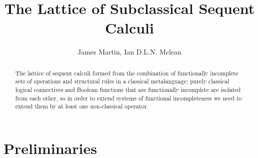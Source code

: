 \documentclass{article}
\author{James Martin, Ian D.L.N. Mclean}
\title{The Lattice of Subclassical Sequent Calculi}
\begin{document}
\maketitle

\begin{abstract}
The lattice of sequent calculi formed from the combination of functionally incomplete sets of operations and structural rules in a classical metalanguage; purely classical logical connectives and Boolean functions that are functionally incomplete are isolated from each other, so in order to extend systems of functional incompleteness we need to extend them by at least one non-classical operator.
\end{abstract}

\part{Preliminaries}
\end{document}
